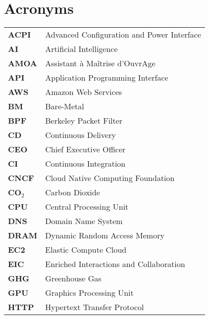 \chapter{Acronyms}

\begin{tabular}{l l}

    \textbf{ACPI} & Advanced Configuration and Power Interface \\
    \textbf{AI} & Artificial Intelligence \\
    \textbf{AMOA} & Assistant à Maîtrise d'OuvrAge \\
    \textbf{API} & Application Programming Interface \\
    \textbf{AWS} & Amazon Web Services \\
    \textbf{BM} & Bare-Metal \\
    \textbf{BPF} & Berkeley Packet Filter \\
    \textbf{CD} & Continuous Delivery \\
    \textbf{CEO} & Chief Executive Officer \\
    \textbf{CI} & Continuous Integration \\
    \textbf{CNCF} & Cloud Native Computing Foundation \\
    \textbf{CO$_2$} & Carbon Dioxide \\
    \textbf{CPU} & Central Processing Unit \\
    \textbf{DNS} & Domain Name System \\
    \textbf{DRAM} & Dynamic Random Access Memory \\
    \textbf{EC2} & Elastic Compute Cloud \\
    \textbf{EIC} & Enriched Interactions and Collaboration \\
    \textbf{GHG} & Greenhouse Gas \\
    \textbf{GPU} & Graphics Processing Unit \\
    \textbf{HTTP} & Hypertext Transfer Protocol \\

\end{tabular}

\pagebreak


